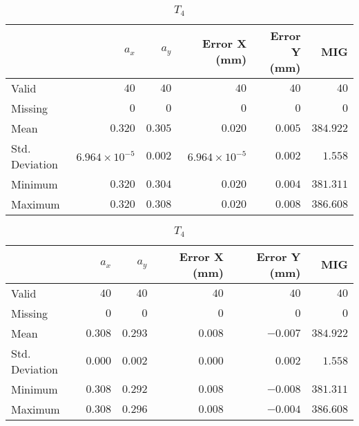 \begin{table}[h]
    \begin{subtable}{\textwidth}
        \centering
        \footnotesize
        \begin{tabular}{lrrrrr}
            \toprule
                & $a_x$ & $a_y$ & Error X (mm) & Error Y (mm) & MIG  \\
            \midrule
			Valid & $40$ & $40$ & $40$ & $40$ & $40$  \\
			Missing & $0$ & $0$ & $0$ & $0$ & $0$  \\
			Mean & $0.320$ & $0.305$ & $0.020$ & $0.005$ & $384.922$  \\
			Std. Deviation & $6.964\times10^{-5}$ & $0.002$ & $6.964\times10^{-5}$ & $0.002$ & $1.558$  \\
			Minimum & $0.320$ & $0.304$ & $0.020$ & $0.004$ & $381.311$  \\
			Maximum & $0.320$ & $0.308$ & $0.020$ & $0.008$ & $386.608$  \\
            \bottomrule
        \end{tabular}
        \caption{$T_3$}
    \end{subtable}

    \vspace{10pt}

    \begin{subtable}{\textwidth}
    \centering
    \footnotesize
    \begin{tabular}{lrrrrr}
        \toprule
            & $a_x$ & $a_y$ & Error X (mm) & Error Y (mm) & MIG  \\
        \midrule
        Valid & $40$ & $40$ & $40$ & $40$ & $40$  \\
        Missing & $0$ & $0$ & $0$ & $0$ & $0$  \\
        Mean & $0.308$ & $0.293$ & $0.008$ & $-0.007$ & $384.922$  \\
        Std. Deviation & $0.000$ & $0.002$ & $0.000$ & $0.002$ & $1.558$  \\
        Minimum & $0.308$ & $0.292$ & $0.008$ & $-0.008$ & $381.311$  \\
        Maximum & $0.308$ & $0.296$ & $0.008$ & $-0.004$ & $386.608$  \\
        \bottomrule
    \end{tabular}
    \caption{$T_4$}
    \end{subtable}

    \vspace{10pt}


\end{table}
